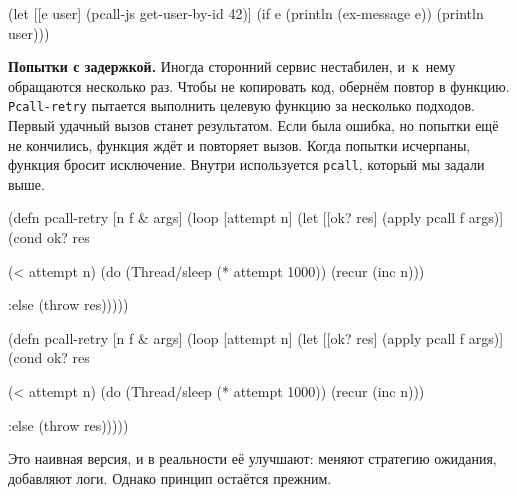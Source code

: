 \else

\begin{english}
  \begin{clojure}
(let [[e user] (pcall-js get-user-by-id 42)]
  (if e
    (println (ex-message e))
    (println user)))
  \end{clojure}
\end{english}

\fi


\textbf{Попытки с задержкой.} Иногда сторонний сервис нестабилен, и~к~нему
обращаются несколько раз. Чтобы не копировать код, обернём повтор в
функцию. \verb|Pcall-retry| пытается выполнить целевую функцию за несколько
подходов. Первый удачный вызов станет результатом. Если была ошибка, но попытки
ещё не кончились, функция ждёт и повторяет вызов. Когда попытки
исчерпаны, функция бросит исключение. Внутри используется \verb|pcall|,
который мы задали выше.


\ifx\devicetype\mobile

\begin{english}
  \begin{clojure}
(defn pcall-retry [n f & args]
  (loop [attempt n]
    (let [[ok? res] (apply pcall f args)]
      (cond
        ok? res

        (< attempt n)
        (do (Thread/sleep
              (* attempt 1000))
            (recur (inc n)))

        :else (throw res)))))
  \end{clojure}
\end{english}

\else

\begin{english}
  \begin{clojure}
(defn pcall-retry [n f & args]
  (loop [attempt n]
    (let [[ok? res] (apply pcall f args)]
      (cond
        ok? res

        (< attempt n)
        (do (Thread/sleep (* attempt 1000))
            (recur (inc n)))

        :else (throw res)))))
  \end{clojure}
\end{english}

\fi

Это наивная версия, и в реальности её улучшают: меняют стратегию ожидания,
добавляют логи. Однако принцип остаётся прежним.

